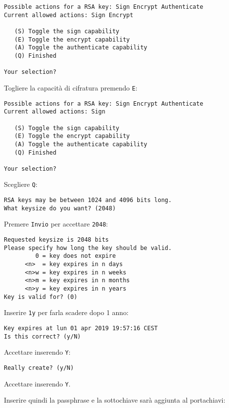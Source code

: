 \documentclass[a4paper,10pt]{article}
\begin{document}
\begin{verbatim}
Possible actions for a RSA key: Sign Encrypt Authenticate
Current allowed actions: Sign Encrypt

   (S) Toggle the sign capability
   (E) Toggle the encrypt capability
   (A) Toggle the authenticate capability
   (Q) Finished

Your selection?
\end{verbatim}

Togliere la capacità di cifratura premendo \texttt{E}:

\begin{verbatim}
Possible actions for a RSA key: Sign Encrypt Authenticate
Current allowed actions: Sign

   (S) Toggle the sign capability
   (E) Toggle the encrypt capability
   (A) Toggle the authenticate capability
   (Q) Finished

Your selection?
\end{verbatim}

Scegliere \texttt{Q}:

\begin{verbatim}
RSA keys may be between 1024 and 4096 bits long.
What keysize do you want? (2048)
\end{verbatim}

Premere \texttt{Invio} per accettare \texttt{2048}:

\begin{verbatim}
Requested keysize is 2048 bits
Please specify how long the key should be valid.
         0 = key does not expire
      <n>  = key expires in n days
      <n>w = key expires in n weeks
      <n>m = key expires in n months
      <n>y = key expires in n years
Key is valid for? (0)
\end{verbatim}

Inserire \texttt{1y} per farla scadere dopo 1 anno:

\begin{verbatim}
Key expires at lun 01 apr 2019 19:57:16 CEST
Is this correct? (y/N)
\end{verbatim}

Accettare inserendo \texttt{Y}:

\begin{verbatim}
Really create? (y/N)
\end{verbatim}

Accettare inserendo \texttt{Y}.

Inserire quindi la passphrase e la sottochiave sarà aggiunta al portachiavi:
\end{document}
